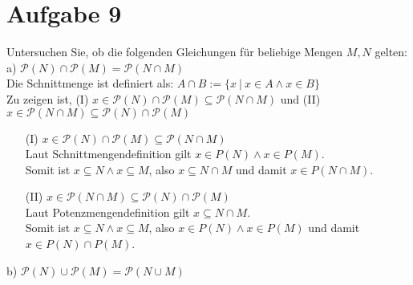 \section*{Aufgabe 9}

Untersuchen Sie, ob die folgenden Gleichungen für beliebige Mengen $M, N$ gelten:\\

a) $\mathcal{P}(N) \cap \mathcal{P}(M) = \mathcal{P}(N \cap M)$\\

Die Schnittmenge ist definiert als: $A \cap B := \{x \ | \ x \in A \land x \in B \}$\\

Zu zeigen ist, (I) $x \in \mathcal{P}(N) \cap \mathcal{P}(M) \subseteq \mathcal{P}(N \cap M)$ und (II) $x \in \mathcal{P}(N \cap M) \subseteq \mathcal{P}(N) \cap \mathcal{P}(M)$

\begin{enumerate}[leftmargin=2em]
\item[(I)] $x \in \mathcal{P}(N) \cap \mathcal{P}(M) \subseteq \mathcal{P}(N \cap M)$\\
Laut Schnittmengendefinition gilt $x \in P(N) \land x \in P(M)$.\\
Somit ist $x \subseteq N \land x \subseteq M$, also $x \subseteq N \cap M$ und damit $x \in P(N \cap M)$.
\item[(II)] $x \in \mathcal{P}(N \cap M) \subseteq \mathcal{P}(N) \cap \mathcal{P}(M)$\\
Laut Potenzmengendefinition gilt $x \subseteq N \cap M$.\\
Somit ist $x \subseteq N \land x \subseteq M$, also $x \in P(N) \land x \in P(M)$ und damit $x \in P(N) \cap P(M)$.
\end{enumerate}

b) $\mathcal{P}(N) \cup \mathcal{P}(M) = \mathcal{P}(N \cup M)$\\
